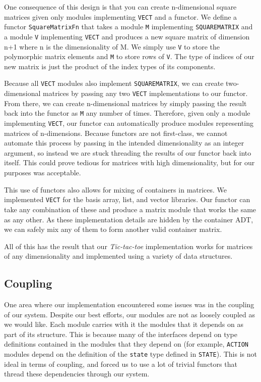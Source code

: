 \documentclass[9pt,letterpaper]{extarticle}
\begin{document}
  One consequence of this design is that you can create n-dimensional square matrices given only
  modules implementing \texttt{VECT} and a functor. We define a functor \texttt{SquareMatrixFn}
  that takes a module \texttt{M} implementing \texttt{SQUAREMATRIX} and a module \texttt{V}
  implementing \texttt{VECT} and produces a new square matrix of dimension n+1 where n is the
  dimensionality of M. We simply use \texttt{V} to store the polymorphic matrix elements and \texttt{M} to
  store rows of \texttt{V}. The type of indices of our new matrix is just the product of the index types
  of its components.
  
  Because all \texttt{VECT} modules also implement \texttt{SQUAREMATRIX}, we
  can create two-dimensional matrices by passing any two \texttt{VECT} implementations to our functor.
  From there, we can create n-dimensional matrices by simply passing the result back into the functor
  as \texttt{M} any number of times. Therefore, given only a module implementing \texttt{VECT}, our
  functor can automatically produce modules representing matrices of n-dimensions.
  Because functors are not first-class, we cannot automate this process by passing in
  the intended dimensionality as an integer argument, so instead we are stuck threading the results
  of our functor back into itself. This could prove tedious for matrices with high dimensionality, but for our
  purposes was acceptable.
  
  This use of functors also allows for mixing of containers in matrices.
  We implemented \texttt{VECT} for the basis array, list, and vector libraries. Our functor can take any
  combination of these and produce a matrix module that works the same
  as any other. As these implementation details are hidden by the container ADT, we can safely mix
  any of them to form another valid container matrix.
  
  All of this has the result that our \textit{Tic-tac-toe} implementation works for matrices of any
  dimensionality and implemented using a variety of data structures.
  
  \subsection{Coupling}
  
  One area where our implementation encountered some issues was in the coupling of our system.
  Despite our best efforts, our modules are not as loosely coupled as we would like. Each module
  carries with it the modules that it depends on as part of its structure. This is because many of the
  interfaces depend on type definitions contained in the modules that they depend on (for example,
  \texttt{ACTION} modules depend on the definition of the \texttt{state} type defined in \texttt{STATE}).
  This is not ideal in terms of
  coupling, and forced us to use a lot of trivial functors that thread these dependencies through our
  system.
  
\end{document}
